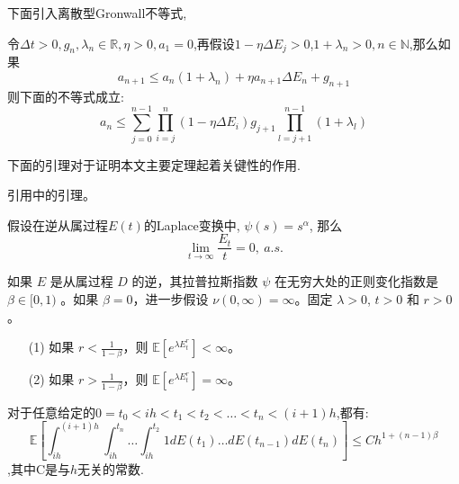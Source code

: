 下面引入离散型Gronwall不等式, 
\begin{lemma}\label{gronwall}
	令$\Delta t > 0,g_n,\lambda _n \in \mathbb{R},\eta > 0,a_1=0$,再假设$1-\eta \Delta E_j > 0$,$1 + \lambda _n > 0,n \in \mathbb{N}$,那么如果
	\begin{equation*}
		a_{n+1} \leq a_n(1+\lambda _n)+\eta a_{n+1}\Delta E_n +g_{n+1}
	\end{equation*}
	则下面的不等式成立:
	\begin{equation}
		a_n \leq \sum\limits_{j=0}^{n-1}\prod_{i=j}^{n}(1-\eta\Delta E_i)g_{j+1}\prod\limits_{l=j+1}^{n-1}(1+\lambda _l)
	\end{equation}
\end{lemma}

下面的引理对于证明本文主要定理起着关键性的作用.

引用\cite{nane2016stability}中的引理。

\begin{lemma}
	假设在逆从属过程$E(t)$的Laplace变换中, $\psi(s)=s^{\alpha}$, 那么
	\begin{equation}
	\lim_{t\to\infty}\frac{E_t}{t}=0,\:a.s.
	\end{equation}
\end{lemma}


\begin{lemma}
	
		如果 $E$ 是从属过程 $D$ 的逆，其拉普拉斯指数 $\psi$ 在无穷大处的正则变化指数是 $\beta \in [0, 1)$ 。如果 $\beta = 0$，进一步假设 $\nu(0, \infty) = \infty$。固定 $\lambda > 0$, $t > 0$ 和 $r > 0$。
		\begin{enumerate}
			\item[(1)] 如果 $r < \frac{1}{1 - \beta}$，则 $\mathbb{E}\left[ e^{\lambda E_t^r} \right] < \infty$。
			\item[(2)] 如果 $r > \frac{1}{1 - \beta}$，则 $\mathbb{E}\left[ e^{\lambda E_t^r} \right] = \infty$。
		\end{enumerate}
	
	
\end{lemma}



\begin{lemma}\label{main lemma}
	对于任意给定的$0 = t_0 < ih < t_1 < t_2 < \ldots <t_n <(i+1)h$,都有:
	\begin{equation}
		\mathbb{E}\left[\int_{ih}^{(i+1)h}
		\int_{ih}^{t_n} \ldots \int_{ih}^{t_2} 1 dE(t_1) \ldots dE(t_{n-1})dE(t_n)\right] \le Ch^{1+(n-1)\beta}
	\end{equation}
	,其中C是与$h$无关的常数.
\end{lemma}



